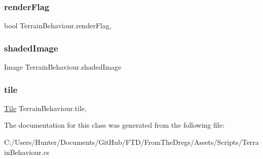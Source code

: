 \mbox{\label{class_terrain_behaviour_ada11b3216887b92ca5f1de3e7165b4c2}} 
\subsubsection{\texorpdfstring{renderFlag}{renderFlag}}
{\footnotesize\ttfamily bool Terrain\+Behaviour.\+render\+Flag\hspace{0.3cm}{\ttfamily [get]}, {\ttfamily [set]}}

\mbox{\label{class_terrain_behaviour_a91996bf69ee24b36099fa7a6b54aeaa5}} 
\subsubsection{\texorpdfstring{shadedImage}{shadedImage}}
{\footnotesize\ttfamily Image Terrain\+Behaviour.\+shaded\+Image\hspace{0.3cm}{\ttfamily [get]}}

\mbox{\label{class_terrain_behaviour_a1c30fc3fee30bea9e90ee4acabcb5819}} 
\subsubsection{\texorpdfstring{tile}{tile}}
{\footnotesize\ttfamily \mbox{\hyperlink{class_tile}{Tile}} Terrain\+Behaviour.\+tile\hspace{0.3cm}{\ttfamily [get]}, {\ttfamily [set]}}



The documentation for this class was generated from the following file\+:\begin{DoxyCompactItemize}
\item 
C\+:/\+Users/\+Hunter/\+Documents/\+Git\+Hub/\+F\+T\+D/\+From\+The\+Dregs/\+Assets/\+Scripts/Terrain\+Behaviour.\+cs\end{DoxyCompactItemize}
